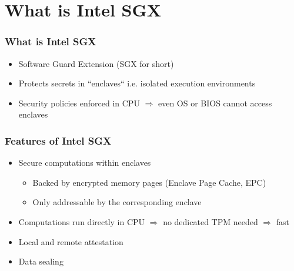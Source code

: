 \section{What is Intel SGX}

\begin{frame}
    \frametitle{What is Intel SGX}
    \begin{itemize}
        \item Software Guard Extension (SGX for short)
        \item Protects secrets in ``enclaves`` i.e. isolated execution environments
        \item Security policies enforced in CPU $\Rightarrow$ even OS or BIOS cannot access enclaves
    \end{itemize}
\end{frame}

\begin{frame}
    \frametitle{Features of Intel SGX}
    \begin{itemize}
        \item Secure computations within enclaves
        \begin{itemize}
            \item Backed by encrypted memory pages (Enclave Page Cache, EPC)
            \item Only addressable by the corresponding enclave
        \end{itemize}
        \item Computations run directly in CPU $\Rightarrow$ no dedicated TPM needed \newline $\Rightarrow$ fast
        \item Local and remote attestation
        \item Data sealing
    \end{itemize}
    

\end{frame}
